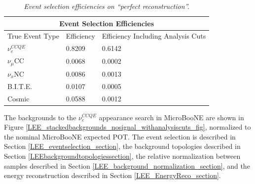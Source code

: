 \begin{table}
\begin{tabular}{ |p{4cm}|p{3cm}|p{6cm}|  }
 \hline
 \multicolumn{3}{|c|}{Event Selection Efficiencies} \\
 \hline
 True Event Type & Efficiency & Efficiency Including Analysis Cuts \\
 \hline \hline
 $\nu_e^{CCQE}$ & 0.8209 & 0.6142\\\hline
 
 $\nu_\mu$CC & 0.0068 & 0.0002\\\hline

 $\nu_x$NC & 0.0086 & 0.0013\\\hline

 B.I.T.E. & 0.0107 & 0.0005 \\\hline

 Cosmic & 0.0588 & 0.0012\\\hline

 \hline
\end{tabular}
\caption{\textit{Event selection efficiencies on ``perfect reconstruction''.}}\label{eventselection_efficiency_table}
\end{table}



The backgrounds to the $\nu_e^{CCQE}$ appearance search in MicroBooNE are shown in Figure \ref{LEE_stackedbackgrounds_nosignal_withanalysiscuts_fig}, normalized to the nominal MicroBooNE expected POT. The event selection is described in Section \ref{LEE_eventselection_section}, the background topologies described in Section \ref{LEEbackgroundtopologiessection}, the relative normalization between samples described in Section \ref{LEE_background_normalization_section}, and the energy reconstruction described in Section \ref{LEE_EnergyReco_section}.


